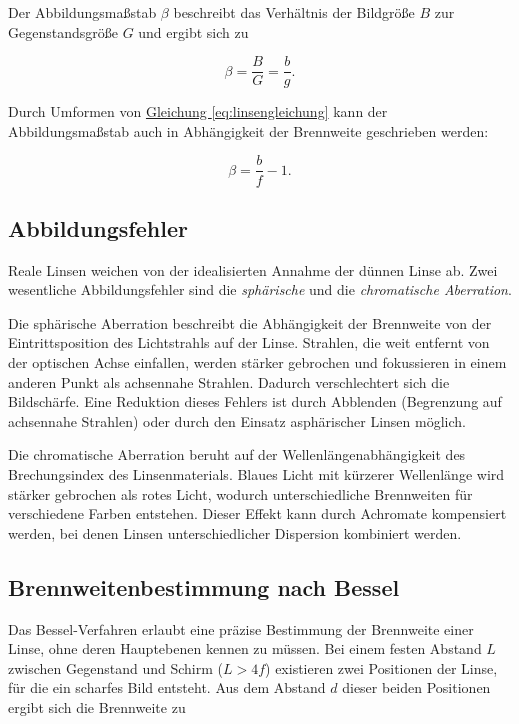 Der Abbildungsmaßstab $\beta$ beschreibt das Verhältnis der Bildgröße $B$ zur Gegenstandsgröße $G$ und ergibt sich zu

\begin{equation}
    \beta = \frac{B}{G} = \frac{b}{g}.
    \label{eq:abbildungsmassstab}
\end{equation}

Durch Umformen von \hyperref[eq:linsengleichung]{Gleichung \ref*{eq:linsengleichung}} kann der Abbildungsmaßstab auch in Abhängigkeit der Brennweite geschrieben werden:

\begin{equation}
    \beta = \frac{b}{f} - 1.
    \label{eq:abbildungsmassstab_f}
\end{equation}

\subsection*{Abbildungsfehler}

Reale Linsen weichen von der idealisierten Annahme der dünnen Linse ab. Zwei wesentliche Abbildungsfehler sind die \textit{sphärische} und die \textit{chromatische Aberration}. 

Die sphärische Aberration beschreibt die Abhängigkeit der Brennweite von der Eintrittsposition des Lichtstrahls auf der Linse. Strahlen, die weit entfernt von der optischen Achse einfallen, werden stärker gebrochen und fokussieren in einem anderen Punkt als achsennahe Strahlen. Dadurch verschlechtert sich die Bildschärfe. Eine Reduktion dieses Fehlers ist durch Abblenden (Begrenzung auf achsennahe Strahlen) oder durch den Einsatz asphärischer Linsen möglich.

Die chromatische Aberration beruht auf der Wellenlängenabhängigkeit des Brechungsindex des Linsenmaterials. Blaues Licht mit kürzerer Wellenlänge wird stärker gebrochen als rotes Licht, wodurch unterschiedliche Brennweiten für verschiedene Farben entstehen. Dieser Effekt kann durch Achromate kompensiert werden, bei denen Linsen unterschiedlicher Dispersion kombiniert werden.

\subsection*{Brennweitenbestimmung nach Bessel}

Das Bessel-Verfahren erlaubt eine präzise Bestimmung der Brennweite einer Linse, ohne deren Hauptebenen kennen zu müssen. Bei einem festen Abstand $L$ zwischen Gegenstand und Schirm ($L > 4f$) existieren zwei Positionen der Linse, für die ein scharfes Bild entsteht. Aus dem Abstand $d$ dieser beiden Positionen ergibt sich die Brennweite zu

